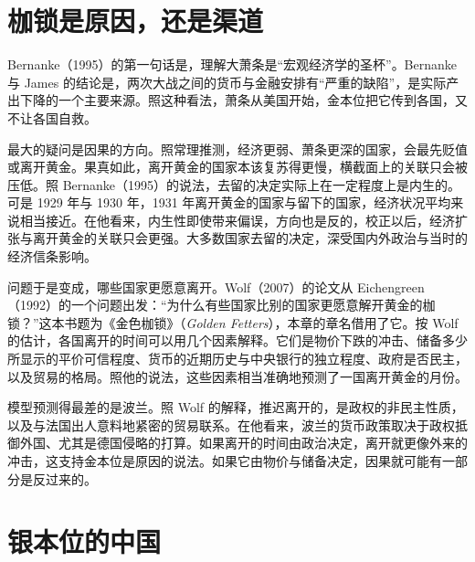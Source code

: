 \section{枷锁是原因，还是渠道}\label{sec:depressionworld-debate}

Bernanke（1995）的第一句话是，理解大萧条是“宏观经济学的圣杯”\cite{bernanke1995}。Bernanke 与 James 的结论是，两次大战之间的货币与金融安排有“严重的缺陷”，是实际产出下降的一个主要来源\cite{bernanke1991}。照这种看法，萧条从美国开始，金本位把它传到各国，又不让各国自救。

最大的疑问是因果的方向。照常理推测，经济更弱、萧条更深的国家，会最先贬值或离开黄金\cite{bernanke1995}。果真如此，离开黄金的国家本该复苏得更慢，横截面上的关联只会被压低。照 Bernanke（1995）的说法，去留的决定实际上在一定程度上是内生的\cite{bernanke1995}。可是 1929 年与 1930 年，1931 年离开黄金的国家与留下的国家，经济状况平均来说相当接近\cite{bernanke1995}。在他看来，内生性即使带来偏误，方向也是反的，校正以后，经济扩张与离开黄金的关联只会更强\cite{bernanke1995}。大多数国家去留的决定，深受国内外政治与当时的经济信条影响\cite{bernanke1995}。

问题于是变成，哪些国家更愿意离开。Wolf（2007）的论文从 Eichengreen（1992）的一个问题出发：“为什么有些国家比别的国家更愿意解开黄金的枷锁？”\cite{wolf2007}这本书题为《金色枷锁》（\emph{Golden Fetters}），本章的章名借用了它\cite{bernanke1995}。按 Wolf 的估计，各国离开的时间可以用几个因素解释\cite{wolf2007}。它们是物价下跌的冲击、储备多少所显示的平价可信程度、货币的近期历史与中央银行的独立程度、政府是否民主，以及贸易的格局\cite{wolf2007}。照他的说法，这些因素相当准确地预测了一国离开黄金的月份\cite{wolf2007}。

模型预测得最差的是波兰\cite{wolf2007}。照 Wolf 的解释，推迟离开的，是政权的非民主性质，以及与法国出人意料地紧密的贸易联系\cite{wolf2007}。在他看来，波兰的货币政策取决于政权抵御外国、尤其是德国侵略的打算\cite{wolf2007}。如果离开的时间由政治决定，离开就更像外来的冲击，这支持金本位是原因的说法。如果它由物价与储备决定，因果就可能有一部分是反过来的。

\section{银本位的中国}\label{sec:depressionworld-silver}

